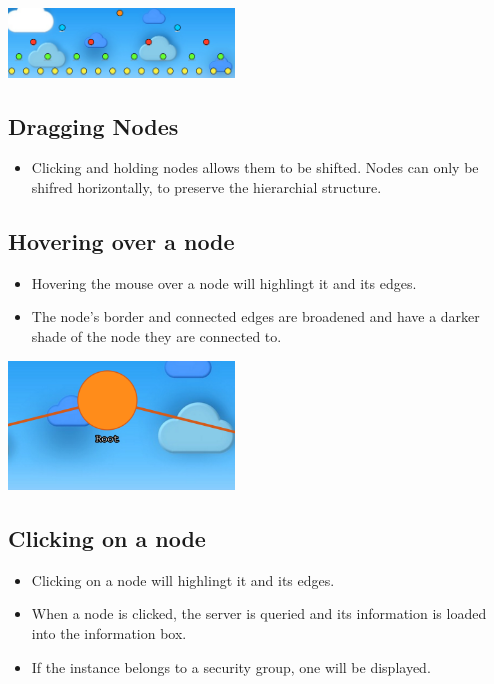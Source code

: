 \documentclass[hidelinks,a4paper,12pt]{article}
\begin{document}
			\begin{center}
				\includegraphics[width=0.45\textwidth]{./images/Dragging.png}
			\end{center}
		
	\subsection{Dragging Nodes}
		\begin {itemize}
		\item Clicking and holding nodes allows them to be shifted. Nodes can only be shifred horizontally, to preserve the hierarchial structure.
	\end{itemize}
		
			\subsection{Hovering over a node}
						\begin {itemize}
						\item Hovering the mouse over a node will highlingt it and its edges.
						\item The node's border and connected edges are broadened and have a darker shade of the node they are connected to. 
					\end{itemize}
					
					\begin{center}
						\includegraphics[width=0.45\textwidth]{./images/NodeHover.png}
						
					\end{center}
	
		
		\subsection{Clicking on a node}
					\begin {itemize}
					\item Clicking on a node will highlingt it and its edges.
					\item When a node is clicked, the server is queried and its information is loaded into the information box.
					\item If the instance belongs to a security group, one will be displayed.
				\end{itemize}
				
\end{document}
